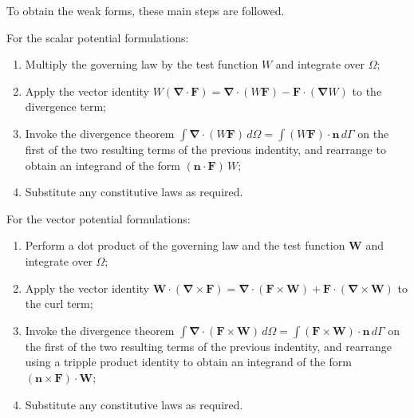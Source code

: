 \documentclass[letterpaper]{article}
\newcommand{\vect}[1]{\mathbf#1}
\newcommand{\nab}{\vect{\nabla}}
\begin{document}
To obtain the weak forms, these main steps are followed. 

For the scalar potential formulations:
\begin{enumerate}
\item Multiply the governing law by the test function $W$ and integrate over $\Omega$;
\item Apply the vector identity $W(\nab\cdot\vect{F})=\nab\cdot(W\vect{F})-\vect{F}\cdot(\nab W)$ to the divergence term;
\item Invoke the divergence theorem $\int\nab\cdot(W\vect{F})\,d\Omega=\int(W\vect{F})\cdot\vect{n}\,d\Gamma$ on the first of the two resulting terms of the previous indentity, and rearrange to obtain an integrand of the form $(\vect{n}\cdot\vect{F})\,W$;
\item Substitute any constitutive laws as required.
\end{enumerate}


For the vector potential formulations:
\begin{enumerate}
\item Perform a dot product of the governing law and the test function $\vect{W}$ and integrate over $\Omega$;
\item Apply the vector identity $\vect{W}\cdot(\nab\times\vect{F})=\nab\cdot(\vect{F}\times\vect{W})+\vect{F}\cdot(\nab\times\vect{W})$ to the curl term;
\item Invoke the divergence theorem $\int\nab\cdot(\vect{F}\times\vect{W})\,d\Omega=\int(\vect{F}\times\vect{W})\cdot\vect{n}\,d\Gamma$ on the first of the two resulting terms of the previous indentity, and rearrange using a tripple product identity to obtain an integrand of the form $(\vect{n}\times\vect{F})\cdot\vect{W}$;
\item Substitute any constitutive laws as required.
\end{enumerate}
\end{document}
